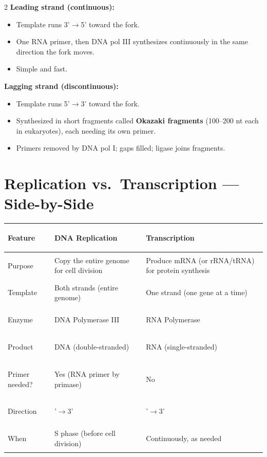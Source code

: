 \documentclass[11pt, letterpaper]{article}
\begin{document}
\begin{tcolorbox}[colback=part4bg, colframe=sectionorange, arc=3pt, boxrule=1pt]
\begin{multicols}{2}
\textbf{Leading strand (continuous):}
\begin{itemize}[noitemsep, leftmargin=*]
  \item Template runs 3'$\to$5' toward the fork.
  \item One RNA primer, then DNA pol III synthesizes continuously in the same direction the fork moves.
  \item Simple and fast.
\end{itemize}
\columnbreak
\textbf{Lagging strand (discontinuous):}
\begin{itemize}[noitemsep, leftmargin=*]
  \item Template runs 5'$\to$3' toward the fork.
  \item Synthesized in short fragments called \textbf{Okazaki fragments} (100--200 nt each in eukaryotes), each needing its own primer.
  \item Primers removed by DNA pol I; gaps filled; ligase joins fragments.
\end{itemize}
\end{multicols}
\end{tcolorbox}

\section*{Replication vs.\ Transcription --- Side-by-Side}

\noindent
{\renewcommand{\arraystretch}{1.5}
\begin{tabularx}{\textwidth}{>{\bfseries\raggedright\arraybackslash}p{3.5cm}
                              >{\raggedright\arraybackslash}X
                              >{\raggedright\arraybackslash}X}
\toprule
\rowcolor{tableheaderorange}
\textbf{Feature} & \textbf{DNA Replication} & \textbf{Transcription} \\
\midrule
\rowcolor{rowOr} Purpose & Copy the entire genome for cell division & Produce mRNA (or rRNA/tRNA) for protein synthesis \\
\rowcolor{rowA}  Template & Both strands (entire genome) & One strand (one gene at a time) \\
\rowcolor{rowOr} Enzyme & DNA Polymerase III & RNA Polymerase \\
\rowcolor{rowA}  Product & DNA (double-stranded) & RNA (single-stranded) \\
\rowcolor{rowOr} Primer needed? & Yes (RNA primer by primase) & No \\
\rowcolor{rowA}  Direction & 5'$\to$3' & 5'$\to$3' \\
\rowcolor{rowOr} When & S phase (before cell division) & Continuously, as needed \\
\bottomrule
\end{tabularx}}
\end{document}
